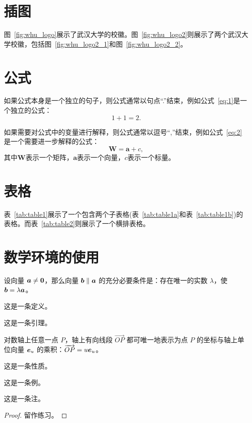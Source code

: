 \section{插图}
图~\ref{fig:whu_logo}展示了武汉大学的校徽。图~\ref{fig:whu_logo2}则展示了两个武汉大学校徽，包括图~\ref{fig:whu_logo2_1}和图~\ref{fig:whu_logo2_2}。

\section{公式}
如果公式本身是一个独立的句子，则公式通常以句点“.”结束，例如公式~\ref{eq:1}是一个独立的公式：
\begin{equation}
    1 + 1 = 2.
    \label{eq:1}
\end{equation}

如果需要对公式中的变量进行解释，则公式通常以逗号“,”结束，例如公式~\ref{eq:2}是一个需要进一步解释的公式：
\begin{equation}
    \mathbf{W} = \mathbf{a} + c,
    \label{eq:2}
\end{equation}
其中$\mathbf{W}$表示一个矩阵，$\mathbf{a}$表示一个向量，$c$表示一个标量。


\section{表格}
表~\ref{tab:table1}展示了一个包含两个子表格(表~\ref{tab:table1a}和表~\ref{tab:table1b})的表格。而表~\ref{tab:table2}则展示了一个横排表格。

\section{数学环境的使用}
\begin{theorem}
  设向量 \(\vb*{a} \neq \vb*{0}\)，那么向量 \(\vb*{b} \parallel \vb*{a}\) 的充分必要条件是：存在唯一的实数 \(\lambda\)，使 \(\vb*{b} = \lambda \vb*{a}\)。
\end{theorem}
\begin{definition}
  这是一条定义。
\end{definition}
\begin{lemma}
  这是一条引理。
\end{lemma}
\begin{corollary}
  对数轴上任意一点 \(P\)，轴上有向线段 \(\overrightarrow{OP}\) 都可唯一地表示为点 \(P\) 的坐标与轴上单位向量 \(\vb*{e}_u\) 的乘积：\(\overrightarrow{OP} = u \vb*{e}_u\)。
\end{corollary}
\begin{proposition}
  这是一条性质。
\end{proposition}
\begin{example}
  这是一条例。
\end{example}
\begin{remark}
  这是一条注。
\end{remark}
\begin{proof}
  留作练习。
\end{proof}

